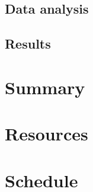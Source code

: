 \documentclass[a4paper,10pt]{article}
\begin{document}
\subsection{Data analysis}


\subsection{Results}



\section{Summary}


\section{Resources}


\section{Schedule}

\end{document}

